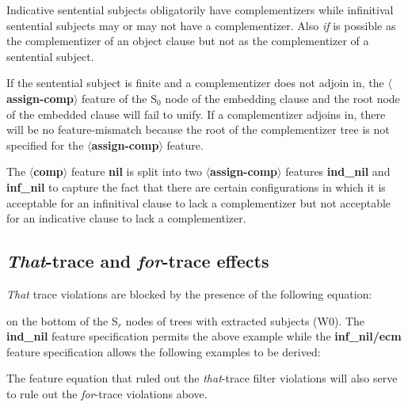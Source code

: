 
Indicative sentential subjects obligatorily have complementizers while
infinitival sentential subjects may or may not have a complementizer. 
Also {\em if} is possible as the complementizer of an object clause
but not as the complementizer of a sentential subject. 


If the sentential subject is finite and a complementizer does
not adjoin in, the {\bf $\langle$assign-comp$\rangle$} feature of the 
S$_{0}$ node of the embedding clause and the root node of the
embedded clause will fail to unify. If a complementizer adjoins in,
there will be no feature-mismatch because the root of the
complementizer tree is not specified for the {\bf $\langle$assign-comp$\rangle$} feature.

The {\bf $\langle$comp$\rangle$} feature {\bf nil} is split into two
{\bf $\langle$assign-comp$\rangle$} features {\bf ind\_nil} and
{\bf inf\_nil} to capture the fact that there are certain configurations in
which it is acceptable for an infinitival clause to lack a complementizer
but not acceptable for an indicative clause to lack a complementizer. 

\subsection{{\em That}-trace and {\em for}-trace effects}


{\em That} trace violations are blocked by the presence of the following
equation:


on the bottom of the S$_{r}$ nodes of trees with extracted subjects (W0). 
The {\bf ind\_nil} feature specification permits the above example
while the {\bf inf\_nil/ecm} feature specification allows the
following examples to be derived:


The feature equation that ruled out the {\em that}-trace filter violations
will also serve to rule out the {\em for}-trace violations above.

